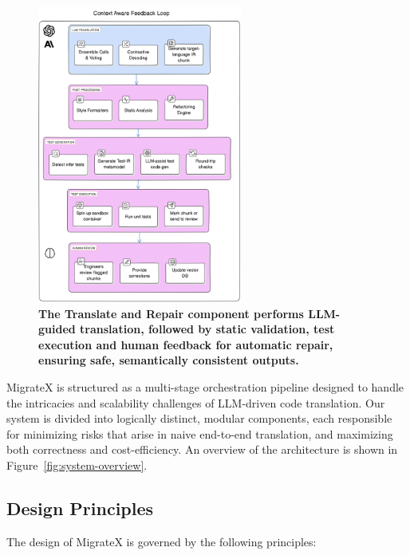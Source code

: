 \documentclass[twocolumn]{article}
\begin{document}
\begin{figure}[t]
    \centering
    \includegraphics[width=0.6\textwidth]{figures/system_overview_2.png}
    \caption{\textbf{The Translate and Repair component performs LLM-guided translation, followed by static validation, test execution and human feedback for automatic repair, ensuring safe, semantically consistent outputs.}}
    \label{fig:translate-overview}
\end{figure}

MigrateX is structured as a multi-stage orchestration pipeline designed to handle the intricacies and scalability challenges of LLM-driven code translation. Our system is divided into logically distinct, modular components, each responsible for minimizing risks that arise in naive end-to-end translation, and maximizing both correctness and cost-efficiency. An overview of the architecture is shown in Figure~\ref{fig:system-overview}.

\subsection{Design Principles}

The design of MigrateX is governed by the following principles:
\end{document}
